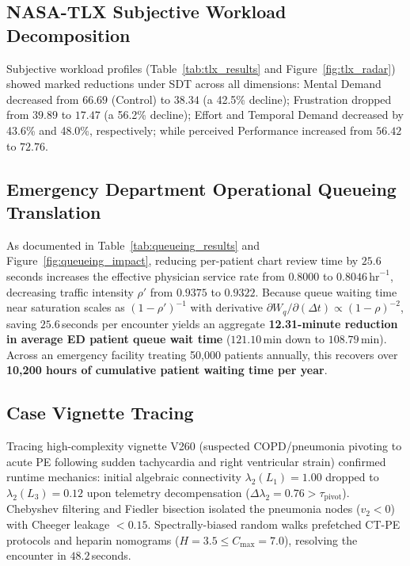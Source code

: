 \documentclass[12pt]{article}
\begin{document}
\subsection*{NASA-TLX Subjective Workload Decomposition}

Subjective workload profiles (Table~\ref{tab:tlx_results} and Figure~\ref{fig:tlx_radar}) showed marked reductions under SDT across all dimensions:
Mental Demand decreased from $66.69$ (Control) to $38.34$ (a 42.5\% decline); Frustration dropped from $39.89$ to $17.47$ (a 56.2\% decline); Effort and Temporal Demand decreased by 43.6\% and 48.0\%, respectively; while perceived Performance increased from $56.42$ to $72.76$.

\subsection*{Emergency Department Operational Queueing Translation}

As documented in Table~\ref{tab:queueing_results} and Figure~\ref{fig:queueing_impact}, reducing per-patient chart review time by $25.6$\,seconds increases the effective physician service rate from $0.8000$ to $0.8046\,\text{hr}^{-1}$, decreasing traffic intensity $\rho'$ from $0.9375$ to $0.9322$. Because queue waiting time near saturation scales as $(1-\rho')^{-1}$ with derivative $\partial W_q / \partial(\Delta t) \propto (1-\rho)^{-2}$, saving $25.6$\,seconds per encounter yields an aggregate \textbf{12.31-minute reduction in average ED patient queue wait time} ($121.10$\,min down to $108.79$\,min). Across an emergency facility treating 50{,}000 patients annually, this recovers over \textbf{10{,}200 hours of cumulative patient waiting time per year}.

\subsection*{Case Vignette Tracing}
Tracing high-complexity vignette V260 (suspected COPD/pneumonia pivoting to acute PE following sudden tachycardia and right ventricular strain) confirmed runtime mechanics: initial algebraic connectivity $\lambda_2(L_1) = 1.00$ dropped to $\lambda_2(L_3) = 0.12$ upon telemetry decompensation ($\Delta \lambda_2 = 0.76 > \tau_{\text{pivot}}$). Chebyshev filtering and Fiedler bisection isolated the pneumonia nodes ($v_2 < 0$) with Cheeger leakage $< 0.15$. Spectrally-biased random walks prefetched CT-PE protocols and heparin nomograms ($H = 3.5 \le C_{\max} = 7.0$), resolving the encounter in $48.2$\,seconds.
\end{document}
